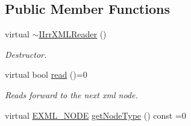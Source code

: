 \subsection*{Public Member Functions}
\begin{DoxyCompactItemize}
\item 
virtual \hyperlink{classirr_1_1io_1_1IIrrXMLReader_ad1d9faeae926afc224d9dea0ad7a08ac}{$\sim$\+I\+Irr\+X\+M\+L\+Reader} ()\hypertarget{classirr_1_1io_1_1IIrrXMLReader_ad1d9faeae926afc224d9dea0ad7a08ac}{}\label{classirr_1_1io_1_1IIrrXMLReader_ad1d9faeae926afc224d9dea0ad7a08ac}

\begin{DoxyCompactList}\small\item\em Destructor. \end{DoxyCompactList}\item 
virtual bool \hyperlink{classirr_1_1io_1_1IIrrXMLReader_a157f458f7dabeeff173f72a0fb443a8e}{read} ()=0
\begin{DoxyCompactList}\small\item\em Reads forward to the next xml node. \end{DoxyCompactList}\item 
virtual \hyperlink{namespaceirr_1_1io_a86a02676c9cbb822e04d60c81b4f33ed}{E\+X\+M\+L\+\_\+\+N\+O\+DE} \hyperlink{classirr_1_1io_1_1IIrrXMLReader_a62b779eddb8a8a7bc18878fc738cf1af}{get\+Node\+Type} () const  =0\hypertarget{classirr_1_1io_1_1IIrrXMLReader_a62b779eddb8a8a7bc18878fc738cf1af}{}\label{classirr_1_1io_1_1IIrrXMLReader_a62b779eddb8a8a7bc18878fc738cf1af}


\end{DoxyCompactItemize}
